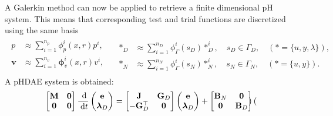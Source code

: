 \documentclass[aspectratio=169]{ISAE-Beamer}
\begin{document}
\begin{frame}
	A Galerkin method can now be applied to retrieve a finite dimensional pH system. This means that corresponding test and trial functions are discretized using the same basis
	\begin{equation*}
	\label{eq:basis_func}
	\begin{aligned}
	\begin{aligned}
	p &\approx \sum_{i=1}^{n_p} \phi_p^i(x, r) p^i, \\
	\bm{v} &\approx \sum_{i=1}^{n_v} \bm\phi_v^i(x, r) v^i, \\
	\end{aligned} \quad
	\begin{aligned}
	*_D &\approx \sum_{i=1}^{n_D} \phi^i_\Gamma(s_D) *^i_D, \quad s_D \in \Gamma_D, \quad (* = \{u, y, \lambda\}), \\
	*_N &\approx \sum_{i=1}^{n_N} \phi_\Gamma^i(s_N) *^i_N, \quad s_N \in \Gamma_N, \quad (* = \{u,  y\}).
	\end{aligned} 
	\end{aligned}
	\end{equation*}
	A pHDAE system is obtained:
	\begin{equation*}
	\begin{aligned}
	\label{eq:discr_phdae}
	\begin{bmatrix}
	\mathbf{M} & \mathbf{0} \\
	\mathbf{0} & \mathbf{0} \\
	\end{bmatrix} \frac{\d}{\d t}
	\begin{pmatrix}
	\mathbf{e}\\
	\bm{\lambda}_D \\
	\end{pmatrix}
	&= \begin{bmatrix}
	\mathbf{J} & \mathbf{G}_D\\
	-\mathbf{G}_D^\top & \mathbf{0} \\
	\end{bmatrix}
	\begin{pmatrix}
	\mathbf{e}\\
	\bm{\lambda}_D \\
	\end{pmatrix} + \begin{bmatrix}
	\mathbf{B}_N & \mathbf{0}\\
	\mathbf{0} & \mathbf{B}_D \\
	\end{bmatrix}
	\begin{pmatrix}

\end{pmatrix}
\end{aligned}
\end{equation*}
\end{frame}
\end{document}
